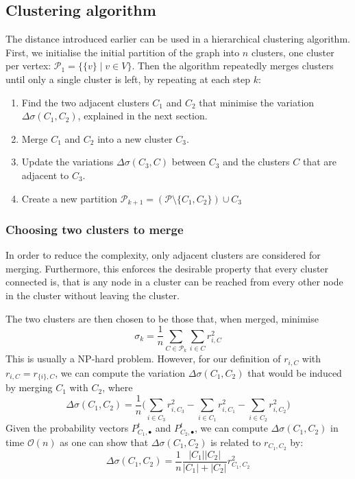 \documentclass[12pt]{article}
\theoremstyle{definition}
\begin{document}
\subsection{Clustering algorithm}
The distance introduced earlier can be used in a hierarchical clustering algorithm. First, we initialise the initial partition of the graph into $n$ clusters, one cluster per vertex: $\mathcal{P}_1 = \{\{v\} \mid v \in V\}$. Then the algorithm repeatedly merges clusters until only a single cluster is left, by repeating at each step $k$:
\begin{enumerate}
	\item Find the two adjacent clusters $C_1$ and $C_2$ that minimise the variation $\Delta\sigma(C_1,C_2)$, explained in the next section.
	\item Merge $C_1$ and $C_2$ into a new cluster $C_3$.
	\item Update the variations $\Delta\sigma(C_3,C)$ between $C_3$ and the clusters $C$ that are adjacent to $C_3$.
	\item Create a new partition $\mathcal{P}_{k+1} = (\mathcal{P} \setminus \{C_1, C_2\}) \cup C_3$
\end{enumerate}
\subsubsection{Choosing two clusters to merge}
In order to reduce the complexity, only adjacent clusters are considered for merging. Furthermore, this enforces the desirable property that every cluster connected is, that is any node in a cluster can be reached from every other node in the cluster without leaving the cluster.
 
The two clusters are then chosen to be those that, when merged, minimise 
\[\sigma_k = \frac{1}{n} \sum_{C \in \mathcal{P}_k} \sum_{i \in C} r_{i,C}^2\]
This is usually a NP-hard problem. However, for our definition of $r_{i,C}$ with $ r_{i,C} = r_{\{i\},C}$, we can compute the variation $\Delta\sigma(C_1,C_2)$ that would be induced by merging $C_1$ with $C_2$, where
\[\Delta\sigma(C_1,C_2) = \frac{1}{n} \big( \sum_{i \in C_3} r_{i,C_3}^2 - \sum_{i \in C_1} r_{i,C_1}^2 - \sum_{i \in C_2} r_{i,C_2}^2 \big)\]
Given the probability vectors $P_{C_1,\bullet}^t$ and $P_{C_2,\bullet}^t$, we can compute $\Delta\sigma(C_1,C_2)$ in time $\mathcal{O}(n)$ as one can show that $\Delta\sigma(C_1,C_2)$ is related to $r_{C_1, C_2}$ by:
\begin{equation}
	\label{eq_theorem3}
	\Delta\sigma(C_1,C_2) = \frac{1}{n}\frac{|C_1||C_2|}{|C_1| + |C_2|} r_{C_1,C_2}^2 
\end{equation}
\end{document}
